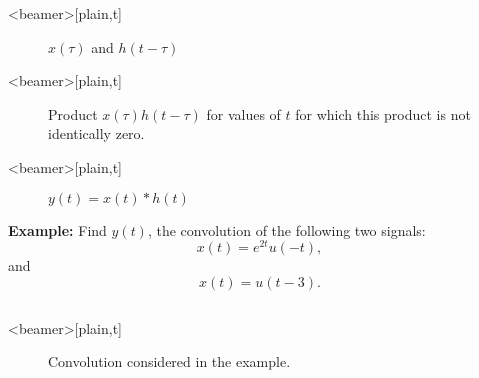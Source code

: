 \begin{frame}<beamer>[plain,t]
    {
    \begin{figure}
      \centering
      
      \caption{$x(\tau)$ and $h(t-\tau)$}\label{fi:ct_conv_example27}
    \end{figure}
    }
\end{frame}


\begin{frame}<beamer>[plain,t]
    {
    \begin{figure}
      \centering
      
      \caption{Product $x(\tau)h(t-\tau)$ for values of $t$ for which this product is not identically zero.}\label{fi:ct_conv_example27working}
    \end{figure}
    }
\end{frame}

\begin{frame}<beamer>[plain,t]
    {
    \begin{figure}
      \centering
      
      \caption{$y(t) = x(t)\ast h(t)$}\label{fi:ct_conv_example27sol}
    \end{figure}
    }
\end{frame}


\begin{frame}{}
    \textbf{ Example: } Find $y(t)$, the convolution of the following two signals:
    \begin{equation*}
        x(t) = e^{2t}u(-t),
    \end{equation*}
    and
    \begin{equation*}
        x(t) = u(t-3).
    \end{equation*}


    {
        \begin{columns}
        \end{columns}
    }
\end{frame}


\begin{frame}<beamer>[plain,t]
    {
    \begin{figure}
      \centering
      
      \caption{Convolution considered in the example.}\label{fi:ct_conv_example28}
    \end{figure}
    }
\end{frame}


